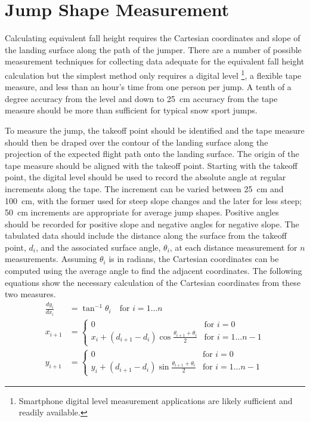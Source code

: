 \documentclass[smallextended]{svjour3}       %
\begin{document}
\section{Jump Shape Measurement}
\label{sec:jump-shape-measurement}
%
Calculating equivalent fall height requires the Cartesian coordinates and slope
of the landing surface along the path of the jumper. There are a number of
possible measurement techniques for collecting data adequate for the equivalent
fall height calculation but the simplest method only requires a digital level
\footnote{Smartphone digital level measurement applications are likely
sufficient and readily available.}, a flexible tape measure, and less than an
hour's time from one person per jump. A tenth of a degree accuracy from the
level and down to 25~\si{\centi\meter} accuracy from the tape measure should be
more than sufficient for typical snow sport jumps.

To measure the jump, the takeoff point should be identified and the tape
measure should then be draped over the contour of the landing surface along the
projection of the expected flight path onto the landing surface. The origin of
the tape measure should be aligned with the takeoff point. Starting with the
takeoff point, the digital level should be used to record the absolute angle at
regular increments along the tape. The increment can be varied between
25~\si{\centi\meter} and 100~\si{\centi\meter}, with the former used for steep
slope changes and the later for less steep; 50~\si{\centi\meter} increments are
appropriate for average jump shapes. Positive angles should be recorded for
positive slope and negative angles for negative slope. The tabulated data
should include the distance along the surface from the takeoff point, $d_i$,
and the associated surface angle, $\theta_i$, at each distance measurement for
$n$ measurements. Assuming $\theta_i$ is in radians, the Cartesian coordinates
can be computed using the average angle to find the adjacent coordinates. The
following equations show the necessary calculation of the Cartesian
coordinates from these two measures.
%
\begin{align}
  \frac{dy_i}{dx_i} & = \tan^{-1}{\theta_i} \quad \text{for } i=1\ldots n \\
  x_{i + 1} & =
  \begin{cases}
    0 & \text{for } i=0 \\
    x_i + (d_{i+1} - d_i)\cos{\frac{\theta_{i+1} + \theta_i}{2}} &  \text{for }
    i=1\ldots n-1
  \end{cases} \\
  y_{i + 1} & =
  \begin{cases}
    0 & \text{for } i=0 \\
    y_i + (d_{i+1} - d_i)\sin{\frac{\theta_{i+1} + \theta_i}{2}} &  \text{for }
    i=1\ldots n-1
  \end{cases}
\end{align}
\end{document}
